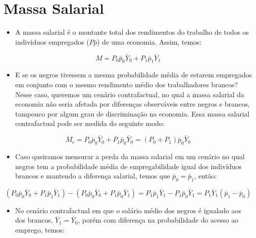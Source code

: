 \documentclass{article}
\begin{document}
\section{Massa Salarial}
\begin{itemize}
	\item A massa salarial é o montante total dos rendimentos do trabalho de todos os indivíduos empregados ($P\bar{p}$) de uma economia. Assim, temos:
\end{itemize}

	\begin{equation}
	M = P_{0}\bar{p}_{0} \bar{Y}_{0} + P_{1}\bar{p}_{1} \bar{Y}_{1} 
	\end{equation}

\begin{itemize}
	\item E se os negros tivessem a mesma probabilidade média de estarem empregados em conjunto com o mesmo rendimento médio dos trabalhadores brancos? Nesse caso, queremos um cenário contrafactual, no qual a massa salarial da economia não seria afetada por diferenças observáveis entre negros e brancos, tampouco por algum grau de discriminação na economia. Essa massa salarial contrafactual pode ser medida do seguinte modo:
\end{itemize}

	\begin{equation}
	M_{c} = P_{0}\bar{p}_{0} \bar{Y}_{0} + P_{1}\bar{p}_{0} \bar{Y}_{0} = (P_{0} + P_{1})\bar{p}_{0}\bar{Y}_{0}
	\end{equation}

\begin{itemize}
	\item Caso queiramos mensurar a perda da massa salarial em um cenário no qual negros tem a probabilidade média de empregabilidade igual dos indivíduos brancos e mantendo a diferença salarial, temos que $\bar{p}_{0} = \bar{p}_{1}$, então:
\end{itemize}

	\begin{equation}
	(P_{0}\bar{p}_{0} \bar{Y}_{0} + P_{1}\bar{p}_{1} \bar{Y}_{1}) - (P_{0}\bar{p}_{0} \bar{Y}_{0} + P_{1}\bar{p}_{0} \bar{Y}_{1}) = P_{1}\bar{p}_{1} \bar{Y}_{1} - P_{1}\bar{p}_{0} \bar{Y}_{1} = P_{1}\bar{Y}_{1}(\bar{p}_{1} - \bar{p}_{0})
	\end{equation}

\begin{itemize}
	\item No cenário contrafactual em que o salário médio dos negros é igualado aos dos brancos, $\bar{Y}_{1} = \bar{Y}_{0}$, porém com diferença na probabilidade do acesso ao emprego, temos:
	\end{itemize}
\end{document}
